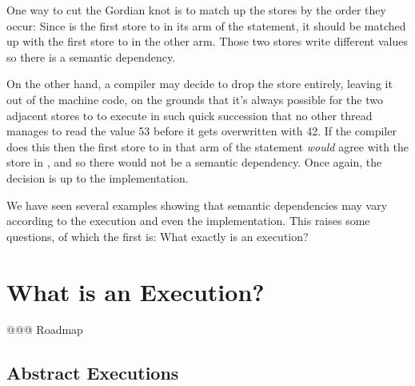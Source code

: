 \documentclass[10]{article}
\begin{document}
One way to cut the Gordian knot is to match up the stores by the order
they occur:
Since  is the first store to  in its arm of the 
statement, it should be matched up with the first store to  in
the other arm.
Those two stores write different values so there is a semantic
dependency.

On the other hand, a compiler may decide to drop the  store entirely, leaving it out of the machine code,
on the grounds that it's always possible for the two adjacent stores
to  to execute in such quick succession that no other thread
manages to read the value 53 before it gets overwritten with 42.
If the compiler does this then the first store to  in that
arm of the  statement \emph{would} agree with the store in
, and so there would not be a semantic dependency.
Once again, the decision is up to the implementation.

\medskip

We have seen several examples showing that semantic dependencies may vary
according to the execution and even the implementation.
This raises some questions, of which the first is:
What exactly is an execution?

\section{What is an Execution?}
\label{sec:What is an Execution?}

@@@ Roadmap

\subsection{Abstract Executions}
\label{sec:Abstract Executions}
\end{document}
